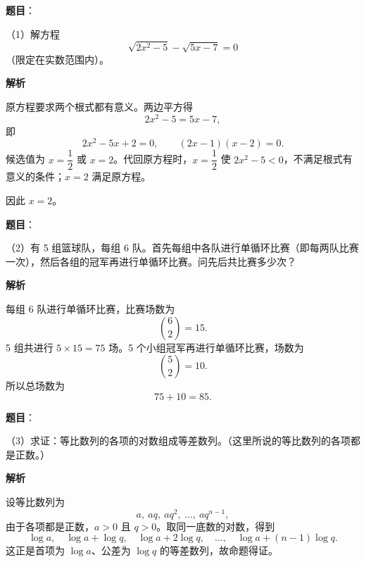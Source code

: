


\begin{answer}

\textbf{题目}：

（1）解方程
\nopagebreak[4]
\[
\sqrt{2x^2-5}-\sqrt{5x-7}=0
\]
（限定在实数范围内）。

\textbf{解析}

原方程要求两个根式都有意义。两边平方得
\nopagebreak[4]
\[
2x^2-5=5x-7,
\]
即
\nopagebreak[4]
\[
2x^2-5x+2=0,
\qquad (2x-1)(x-2)=0.
\]
候选值为 $x=\dfrac12$ 或 $x=2$。代回原方程时，$x=\dfrac12$ 使 $2x^2-5<0$，不满足根式有意义的条件；$x=2$ 满足原方程。

因此 $x=2$。


\end{answer}
\begin{answer}

\textbf{题目}：

（2）有 5 组篮球队，每组 6 队。首先每组中各队进行单循环比赛（即每两队比赛一次），然后各组的冠军再进行单循环比赛。问先后共比赛多少次？

\textbf{解析}

每组 6 队进行单循环比赛，比赛场数为
\nopagebreak[4]
\[
\binom62=15.
\]
5 组共进行 $5\times15=75$ 场。5 个小组冠军再进行单循环比赛，场数为
\nopagebreak[4]
\[
\binom52=10.
\]
所以总场数为
\nopagebreak[4]
\[
75+10=85.
\]


\end{answer}
\begin{answer}

\textbf{题目}：

（3）求证：等比数列的各项的对数组成等差数列。（这里所说的等比数列的各项都是正数。）

\textbf{解析}

设等比数列为
\nopagebreak[4]
\[
a,\ aq,\ aq^2,\ \ldots,\ aq^{n-1},
\]
由于各项都是正数，$a>0$ 且 $q>0$。取同一底数的对数，得到
\nopagebreak[4]
\[
\log a,\quad \log a+\log q,\quad \log a+2\log q,\quad\ldots,\quad
\log a+(n-1)\log q.
\]
这正是首项为 $\log a$、公差为 $\log q$ 的等差数列，故命题得证。


\end{answer}
